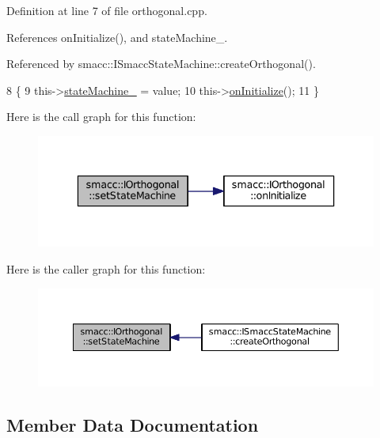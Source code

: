 Definition at line 7 of file orthogonal.\+cpp.



References on\+Initialize(), and state\+Machine\+\_\+.



Referenced by smacc\+::\+I\+Smacc\+State\+Machine\+::create\+Orthogonal().


\begin{DoxyCode}
8 \{
9     this->\hyperlink{classsmacc_1_1IOrthogonal_a6c62a3a971d827d0b2c0b273a49a2129}{stateMachine\_} = value;
10     this->\hyperlink{classsmacc_1_1IOrthogonal_ad21074708f877791f5604916dfd3b917}{onInitialize}();
11 \}
\end{DoxyCode}


Here is the call graph for this function\+:
\nopagebreak
\begin{figure}[H]
\begin{center}
\leavevmode
\includegraphics[width=336pt]{classsmacc_1_1IOrthogonal_a4ebfb1945e5b2ad505be791f9e31b843_cgraph}
\end{center}
\end{figure}




Here is the caller graph for this function\+:
\nopagebreak
\begin{figure}[H]
\begin{center}
\leavevmode
\includegraphics[width=350pt]{classsmacc_1_1IOrthogonal_a4ebfb1945e5b2ad505be791f9e31b843_icgraph}
\end{center}
\end{figure}




\subsection{Member Data Documentation}
